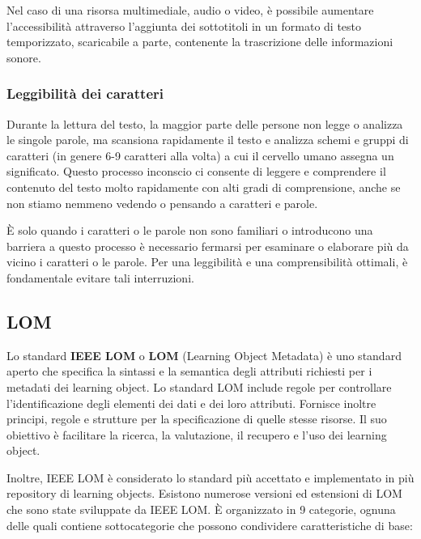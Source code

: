 Nel caso di una risorsa multimediale, audio o video, è possibile aumentare l'accessibilità attraverso l'aggiunta dei sottotitoli in un formato di testo temporizzato, scaricabile a parte, contenente la trascrizione delle informazioni sonore\cite{accessibility}.

\subsubsection{Leggibilità dei caratteri}
Durante la lettura del testo, la maggior parte delle persone non legge o analizza le singole parole, ma scansiona rapidamente il testo e analizza schemi e gruppi di caratteri (in genere 6-9 caratteri alla volta) a cui il cervello umano assegna un significato. Questo processo inconscio ci consente di leggere e comprendere il contenuto del testo molto rapidamente con alti gradi di comprensione, anche se non stiamo nemmeno vedendo o pensando a caratteri e parole.

È solo quando i caratteri o le parole non sono familiari o introducono una barriera a questo processo è necessario fermarsi per esaminare o elaborare più da vicino i caratteri o le parole. Per una leggibilità e una comprensibilità ottimali, è fondamentale evitare tali interruzioni.

\subsection{LOM}
Lo standard \textbf{IEEE LOM} o \textbf{LOM} (Learning Object Metadata) è uno standard aperto che
specifica la sintassi e la semantica degli attributi richiesti per i metadati dei learning object. Lo standard LOM include regole per controllare l'identificazione degli elementi dei dati e dei loro attributi. Fornisce inoltre principi, regole e strutture per la specificazione di quelle stesse risorse. Il suo obiettivo è facilitare la ricerca, la valutazione, il recupero e l'uso dei learning object.

Inoltre, IEEE LOM è considerato lo standard più accettato e implementato in più repository di learning objects. Esistono numerose versioni ed estensioni di LOM che sono state sviluppate da IEEE LOM. È organizzato in 9 categorie, ognuna delle quali contiene sottocategorie che possono condividere caratteristiche di base:

